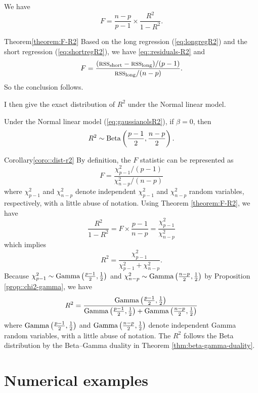 \begin{theorem}
\label{theorem:F-R2}We have 
\[
F=\frac{n-p}{p-1}\times\frac{R^{2}}{1-R^{2}}.
\]
\end{theorem}

\begin{myproof}{Theorem}{\ref{theorem:F-R2}}
Based on the long regression (\ref{eq:longregR2}) and the short regression
(\ref{eq:shortregR2}), we have \eqref{eq::residuals-R2} and 
\[
F=\frac{(\textsc{rss}_{\text{short}}-\textsc{rss}_{\text{long}})/(p-1)}{\textsc{rss}_{\text{long}}/(n-p)} . 
\]
So the conclusion follows. 
\end{myproof}

I then give the exact distribution of $R^2$ under the Normal linear model. 

\begin{corollary}\label{coro::dist-r2}
Under the Normal linear model (\ref{eq:gaussianolsR2}), if $\beta =0$,
then 
\[
R^{2}\sim\textup{Beta}\left(\frac{p-1}{2},\frac{n-p}{2}\right).
\]
\end{corollary}
%
\begin{myproof}{Corollary}{\ref{coro::dist-r2}}
By definition, the $F$ statistic can be represented as 
\[
F=\frac{\chi_{p-1}^{2}/(p-1)}{\chi_{n-p}^{2}/(n-p)}
\]
where $\chi_{p-1}^{2}$ and $\chi_{n-p}^{2}$ denote independent $\chi_{p-1}^{2}$ and $\chi_{n-p}^{2}$ random variables, respectively, with a little abuse of notation. Using Theorem \ref{theorem:F-R2},
we have
\[
\frac{R^{2}}{1-R^{2}}=F\times\frac{p-1}{n-p}=\frac{\chi_{p-1}^{2}}{\chi_{n-p}^{2}}
\]
which implies
\[ 
R^{2}=\frac{\chi_{p-1}^{2}}{\chi_{p-1}^{2}+\chi_{n-p}^{2}}\text{.}
\]
Because $\chi_{p-1}^{2}\sim\textup{Gamma}\left(\frac{p-1}{2},\frac{1}{2}\right)$
and $\chi_{n-p}^{2}\sim\textup{Gamma}\left(\frac{n-p}{2},\frac{1}{2}\right)$ by Proposition \ref{prop::chi2-gamma},
we have
$$
R^{2} 
=\frac{\textup{Gamma}\left(\frac{p-1}{2},\frac{1}{2}\right)}{\textup{Gamma}\left(\frac{p-1}{2},\frac{1}{2}\right)+\textup{Gamma}\left(\frac{n-p}{2},\frac{1}{2}\right)} 
$$
where $\textup{Gamma}\left(\frac{p-1}{2},\frac{1}{2}\right)$ and $\textup{Gamma}\left(\frac{n-p}{2},\frac{1}{2}\right)$ denote independent Gamma random variables, with a little abuse of notation. 
The $R^2$ follows the Beta distribution by the Beta--Gamma duality in Theorem \ref{thm:beta-gamma-duality}. 
\end{myproof}
%


\section{Numerical examples}

